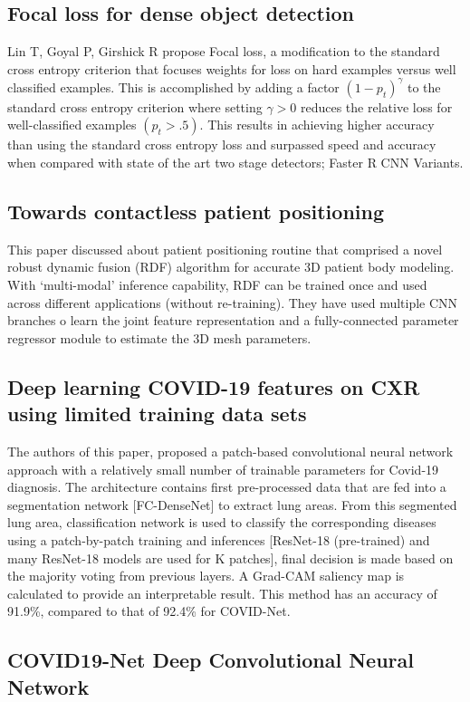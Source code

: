 \documentclass{sigkddExp}
\begin{document}
\subsection{Focal loss for dense object detection}
Lin T, Goyal P, Girshick R propose Focal loss, a modification to the standard cross
entropy criterion that focuses weights for loss on hard examples versus well
classified examples. This is accomplished by adding a factor $(1 - p_t)^\gamma$ to the
standard cross entropy criterion where setting $\gamma  > 0$ reduces the relative loss 
for well-classified examples $(p_t > .5)$. This results in achieving higher accuracy 
than using the standard cross entropy loss and surpassed speed and accuracy when 
compared with state of the art two stage detectors; Faster R CNN Variants.


\subsection{Towards contactless patient positioning}
This paper discussed about patient positioning routine that comprised a novel robust 
dynamic fusion (RDF) algorithm for accurate 3D patient body modeling. 
With ‘multi-modal’ inference capability, RDF can be trained once and used across 
different applications (without re-training). They have used multiple CNN branches 
o learn the joint feature representation and a fully-connected parameter regressor 
module to estimate the 3D mesh parameters.


\subsection{Deep learning COVID-19 features on CXR using limited training data sets}
The authors of this paper, proposed a patch-based convolutional neural network approach
with a relatively small number of trainable parameters for Covid-19 diagnosis.
The architecture contains first pre-processed data that are fed into a segmentation
network [FC-DenseNet] to extract lung areas. From this segmented lung area, classification
network is used to classify the corresponding diseases using a patch-by-patch training
and inferences [ResNet-18 (pre-trained) and many ResNet-18 models are used for K patches],
final decision is made based on the majority voting from previous layers. A Grad-CAM
saliency map is calculated to provide an interpretable result. This method has an accuracy
of 91.9\%, compared to that of 92.4\% for COVID-Net.

\subsection{COVID19-Net Deep Convolutional Neural Network}
\end{document}

